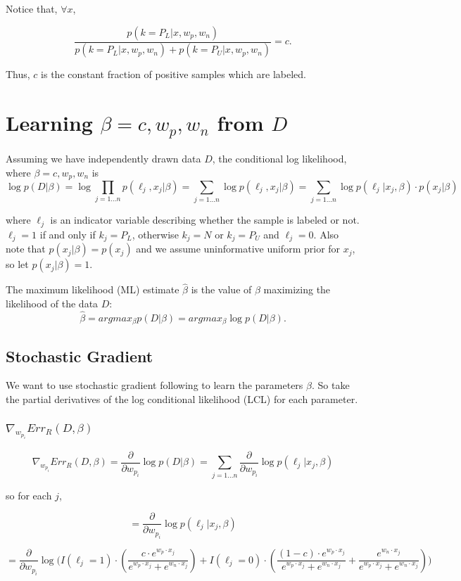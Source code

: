 \documentclass[]{article}
\begin{document}
Notice that, $\forall x$,

$$
\frac{p(k=P_L | x, w_p, w_n)}{p(k=P_L | x, w_p, w_n) + p(k=P_U | x, w_p, w_n)} = c.
$$

Thus, $c$ is the constant fraction of positive samples which are labeled.  

\section{Learning $\beta = c, w_p, w_n$ from $D$}

Assuming we have independently drawn data $D$, the conditional log likelihood, where $\beta = c, w_p, w_n$ is
$$
\log{p(D | \beta)} = \log \prod_{j=1...n}{p(\ell_j, x_j | \beta)} = \sum_{j=1...n}{\log{p(\ell_j, x_j | \beta)}} = \sum_{j=1...n}{\log{p(\ell_j | x_j, \beta)}} \cdot p(x_j | \beta)
$$

where $\ell_j$ is an indicator variable describing whether the sample is labeled or not. $\ell_j = 1$ if and only if $k_j=P_L$, otherwise $k_j = N$ or $k_j=P_U$ and $\ell_j = 0$.  Also note that $p(x_j|\beta) = p(x_j)$ and we assume uninformative uniform prior for $x_j$, so let $p(x_j|\beta) = 1$.

The maximum likelihood (ML) estimate $\hat \beta$ is the value of $\beta$ maximizing the likelihood of the data $D$:
$$
\hat \beta = arg max_{\beta} p(D | \beta) = arg max_{\beta} \log{p(D | \beta)}.
$$

\subsection{Stochastic Gradient}
We want to use stochastic gradient following to learn the parameters $\beta$. So take the partial derivatives of the log conditional likelihood (LCL) for each parameter.

\subsubsection{$ \nabla_{w_{p_i}}{Err_R (D, \beta)}$}

$$
\nabla_{w_{p_i}}{Err_R (D, \beta)} = \frac{\partial}{\partial w_{p_i}} \log{p(D|\beta)} =  \sum_{j=1...n}{\frac{\partial}{\partial w_{p_i}}\log{p(\ell_j | x_j, \beta)}}
$$

so for each $j$,

$$
 = \frac{\partial}{\partial w_{p_i}}\log{p(\ell_j | x_j, \beta)}
$$

$$
 = \frac{\partial}{\partial w_{p_i}}
		\log{\Bigg(
			I(\ell_j=1) \cdot \left( \frac{c \cdot e^{w_p \cdot x_j}}{e^{w_p \cdot x_j} + e^{w_n \cdot x_j}} \right) + 
			I(\ell_j=0) \cdot \left(\frac{(1 - c) \cdot e^{w_p \cdot x_j}}{e^{w_p \cdot x_j} + e^{w_n \cdot x_j}}  + \frac{e^{w_n \cdot x_j}}{e^{w_p \cdot x_j} + e^{w_n \cdot x_j}} \right)
		\Bigg)}
$$
\end{document}
